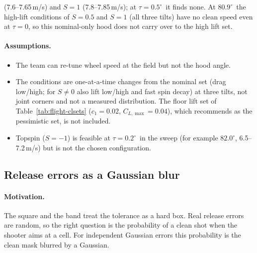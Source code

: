 (7.6--7.65\,\unit{m/s}\predicted) and $S=1$ (7.8--7.85\,\unit{m/s}\predicted); at
$\tau=0.5^\circ$\assumed\ it finds none.
At $80.9^\circ$\predicted\ the high-lift conditions of $S=0.5$ and $S=1$ (all three tilts) have no
clean speed even at $\tau=0$, so this nominal-only hood does not carry over to the high lift set.

\paragraph{Assumptions.}
\begin{itemize}
  \item The team can re-tune wheel speed at the field but not the hood angle.
  \item The conditions are one-at-a-time changes from the nominal set (drag low/high; for $S\ne0$ also
    lift low/high and fast spin decay) at three tilts, not joint corners and not a measured distribution.
    The floor lift set of Table~\ref{tab:flight-clsets} ($c_1=0.02$\assumed, $C_{L,\max}=0.04$\assumed),
    which  recommends as the pessimistic set, is not included.
  \item Topspin ($S=-1$\assumed) is feasible at $\tau=0.2^\circ$\assumed\ in the sweep
    (for example $82.0^\circ$\predicted, 6.5--7.2\,\unit{m/s}\predicted) but is not the chosen
    configuration.
\end{itemize}

\subsection{Release errors as a Gaussian blur}
\label{sec:robust_spec-smooth}

\paragraph{Motivation.}
The square and the band treat the tolerance as a hard box.
Real release errors are random, so the right question is the probability of a clean shot when the
shooter aims at a cell.
For independent Gaussian errors this probability is the clean mask blurred by a Gaussian.

